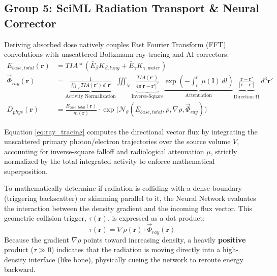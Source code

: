 \documentclass[11pt,a4paper]{article}
\begin{document}
\subsection{Group 5: SciML Radiation Transport \& Neural Corrector}
Deriving absorbed dose natively couples Fast Fourier Transform (FFT) convolutions with unscattered Boltzmann ray-tracing and AI correctors:
\begin{align}
    E_{base,total}(\mathbf{r}) &= TIA \ast (\bar{E}_{\beta} K_{\beta,lung} + \bar{E}_{\gamma} K_{\gamma,water}) \\
    \vec{\Phi}_{ray}(\mathbf{r}) &= \underbrace{\frac{1}{\iiint_V TIA(\mathbf{r}') \, d^3\mathbf{r}'}}_{\text{Activity Normalization}} \iiint_{V} \underbrace{\frac{TIA(\mathbf{r}')}{4\pi |\mathbf{r} - \mathbf{r}'|^2}}_{\text{Inverse-Square}} \underbrace{\exp\left( -\int_{\mathbf{r}'}^{\mathbf{r}} \mu(\mathbf{l}) \, dl \right)}_{\text{Attenuation}} \underbrace{\frac{\mathbf{r} - \mathbf{r}'}{|\mathbf{r} - \mathbf{r}'|}}_{\text{Direction } \mathbf{\hat{\Omega}}} \, d^3\mathbf{r}' \label{eq:ray_tracing} \\
    D_{phys}(\mathbf{r}) &= \frac{E_{base,total}(\mathbf{r})}{m(\mathbf{r})} \cdot \exp\Big(\mathcal{N}_\theta(E_{base,total}, \rho, \nabla\rho, \vec{\Phi}_{ray})\Big)
\end{align}

Equation \ref{eq:ray_tracing} computes the directional vector flux by integrating the unscattered primary photon/electron trajectories over the source volume $V$, accounting for inverse-square falloff and radiological attenuation $\mu$, strictly normalized by the total integrated activity to enforce mathematical superposition. 

To mathematically determine if radiation is colliding with a dense boundary (triggering backscatter) or skimming parallel to it, the Neural Network evaluates the interaction between the density gradient and the incoming flux vector. This geometric collision trigger, $\tau(\mathbf{r})$, is expressed as a dot product:
\begin{equation}
    \tau(\mathbf{r}) = \nabla\rho(\mathbf{r}) \cdot \vec{\Phi}_{ray}(\mathbf{r})
\end{equation}
Because the gradient $\nabla\rho$ points toward increasing density, a heavily \textbf{positive} product ($\tau \gg 0$) indicates that the radiation is moving directly into a high-density interface (like bone), physically cueing the network to reroute energy backward.
\end{document}
